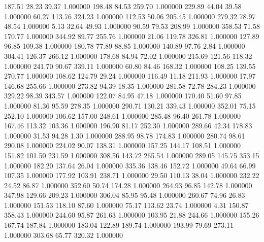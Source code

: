     187.51     28.23     39.37  1.000000
    198.48     84.53    259.70  1.000000
    229.89     44.04     39.58  1.000000
     60.27    113.76    324.23  1.000000
    112.53     50.06    205.45  1.000000
    279.32     78.97     48.54  1.000000
      5.13     32.64     49.93  1.000000
     90.59     79.53    208.99  1.000000
    358.53     71.58    170.77  1.000000
    344.92     89.77    255.76  1.000000
     21.06    119.78    326.81  1.000000
    127.89     96.85    109.38  1.000000
    180.78     77.89     88.85  1.000000
    140.89     97.76      2.84  1.000000
    304.41    126.37    266.12  1.000000
    178.68     84.94     72.02  1.000000
    215.69    121.56    118.32  1.000000
    241.70     90.67    339.11  1.000000
     60.80     84.46    168.32  1.000000
    108.25    139.55    270.77  1.000000
    108.62    124.79     29.24  1.000000
    116.49     11.18    211.93  1.000000
     17.97    146.68    255.66  1.000000
    273.82     94.39     18.35  1.000000
    281.58     72.78    284.23  1.000000
    329.22     98.39    343.57  1.000000
    122.07     84.95     47.18  1.000000
    170.40     51.60     97.85  1.000000
     81.36     95.59    278.35  1.000000
    290.71    130.21    339.43  1.000000
    352.01     75.15    252.10  1.000000
    106.62    157.00    248.61  1.000000
    285.48     96.40    261.78  1.000000
    167.46    113.32    103.36  1.000000
    196.90     81.17    252.30  1.000000
    289.66     42.34    178.83  1.000000
     31.53     94.28      1.30  1.000000
    288.95     98.78    174.83  1.000000
    280.74     98.61    290.08  1.000000
    224.02     90.07    138.31  1.000000
    157.25    144.17    108.51  1.000000
    151.82    101.50    231.59  1.000000
    308.56    143.72    265.54  1.000000
    289.05    145.75    353.15  1.000000
    182.20    137.64     26.04  1.000000
    335.36    138.46    152.72  1.000000
     49.64     66.99    107.35  1.000000
    177.92    103.91    238.71  1.000000
     29.50    110.13     38.04  1.000000
    232.22     24.52     86.87  1.000000
    352.60     50.74    174.28  1.000000
    264.93     96.85    142.78  1.000000
    347.98    129.66    209.23  1.000000
    306.04     85.95     95.48  1.000000
    260.67     74.96     26.83  1.000000
    151.53    118.10     87.60  1.000000
     75.17    113.62     23.74  1.000000
      4.31    150.87    358.43  1.000000
    244.60     95.87    261.63  1.000000
    103.95     21.88    244.66  1.000000
    155.26    167.74    187.84  1.000000
    183.04    122.89    189.74  1.000000
    193.99     79.69    273.11  1.000000
    303.68     65.77    320.32  1.000000
